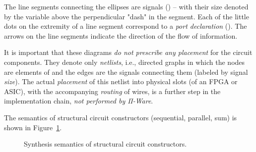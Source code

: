             The line segments connecting the ellipses are signals () – with their size
            denoted by the variable above the perpendicular "dash" in the segment.
            Each of the little dots on the extremity of a line segment correspond to a \emph{port declaration}
            (). The arrows on the line segments indicate the direction of the flow of information.

            It is important that these diagrams \emph{do not prescribe any placement} for the circuit components.
            They denote only \emph{netlists}, i.e., directed graphs in which the nodes are elements of 
            and the edges are the signals connecting them (labeled by signal \emph{size}).
            The actual \emph{placement} of this netlist into physical slots (of an \ac{FPGA} or \ac{ASIC}),
            with the accompanying \emph{routing} of wires, is a further step in the implementation chain,
            \emph{not performed by Π-Ware}.

            The semantics of structural circuit constructors (sequential, parallel, sum) is
            shown in Figure~\ref{fig:semantics-syn-structural}.

            \begin{figure}[ht]
                \caption{Synthesis semantics of structural circuit constructors.\label{fig:semantics-syn-structural}}
            \end{figure}

